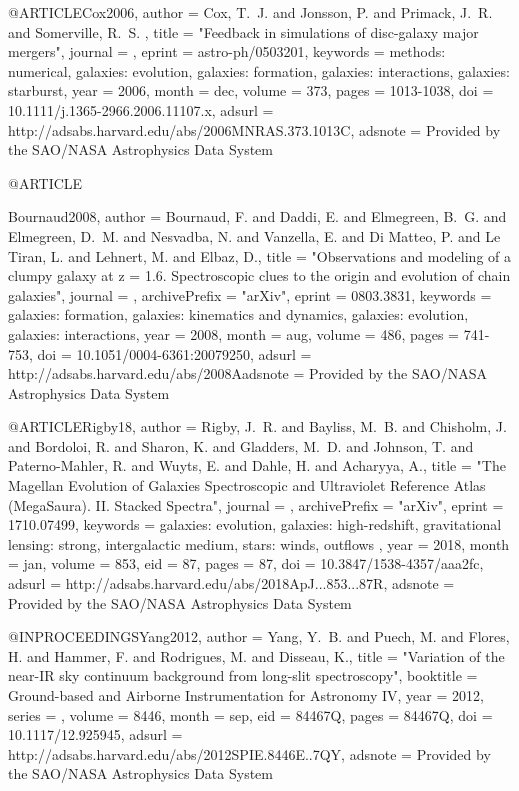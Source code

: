 \documentclass{aa}
\begin{document}
{{{{{{{@ARTICLE{Cox2006,
   author = {{Cox}, T.~J. and {Jonsson}, P. and {Primack}, J.~R. and {Somerville}, R.~S.
	},
    title = "{Feedback in simulations of disc-galaxy major mergers}",
  journal = {\mnras},
   eprint = {astro-ph/0503201},
 keywords = {methods: numerical, galaxies: evolution, galaxies: formation, galaxies: interactions, galaxies: starburst},
     year = 2006,
    month = dec,
   volume = 373,
    pages = {1013-1038},
      doi = {10.1111/j.1365-2966.2006.11107.x},
   adsurl = {http://adsabs.harvard.edu/abs/2006MNRAS.373.1013C},
  adsnote = {Provided by the SAO/NASA Astrophysics Data System}
}

@ARTICLE{Bournaud2008,
   author = {{Bournaud}, F. and {Daddi}, E. and {Elmegreen}, B.~G. and {Elmegreen}, D.~M. and 
	{Nesvadba}, N. and {Vanzella}, E. and {Di Matteo}, P. and {Le Tiran}, L. and 
	{Lehnert}, M. and {Elbaz}, D.},
    title = "{Observations and modeling of a clumpy galaxy at z = 1.6. Spectroscopic clues to the origin and evolution of chain galaxies}",
  journal = {\aap},
archivePrefix = "arXiv",
   eprint = {0803.3831},
 keywords = {galaxies: formation, galaxies: kinematics and dynamics, galaxies: evolution, galaxies: interactions},
     year = 2008,
    month = aug,
   volume = 486,
    pages = {741-753},
      doi = {10.1051/0004-6361:20079250},
   adsurl = {http://adsabs.harvard.edu/abs/2008Aadsnote = {Provided by the SAO/NASA Astrophysics Data System}
}

@ARTICLE{Rigby18,
   author = {{Rigby}, J.~R. and {Bayliss}, M.~B. and {Chisholm}, J. and {Bordoloi}, R. and 
	{Sharon}, K. and {Gladders}, M.~D. and {Johnson}, T. and {Paterno-Mahler}, R. and 
	{Wuyts}, E. and {Dahle}, H. and {Acharyya}, A.},
    title = "{The Magellan Evolution of Galaxies Spectroscopic and Ultraviolet Reference Atlas (MegaSaura). II. Stacked Spectra}",
  journal = {\apj},
archivePrefix = "arXiv",
   eprint = {1710.07499},
 keywords = {galaxies: evolution, galaxies: high-redshift, gravitational lensing: strong, intergalactic medium, stars: winds, outflows },
     year = 2018,
    month = jan,
   volume = 853,
      eid = {87},
    pages = {87},
      doi = {10.3847/1538-4357/aaa2fc},
   adsurl = {http://adsabs.harvard.edu/abs/2018ApJ...853...87R},
  adsnote = {Provided by the SAO/NASA Astrophysics Data System}
}

@INPROCEEDINGS{Yang2012,
   author = {{Yang}, Y.~B. and {Puech}, M. and {Flores}, H. and {Hammer}, F. and 
	{Rodrigues}, M. and {Disseau}, K.},
    title = "{Variation of the near-IR sky continuum background from long-slit spectroscopy}",
booktitle = {Ground-based and Airborne Instrumentation for Astronomy IV},
     year = 2012,
   series = {\procspie},
   volume = 8446,
    month = sep,
      eid = {84467Q},
    pages = {84467Q},
      doi = {10.1117/12.925945},
   adsurl = {http://adsabs.harvard.edu/abs/2012SPIE.8446E..7QY},
  adsnote = {Provided by the SAO/NASA Astrophysics Data System}
}

}}}}}}}}
\end{document}
